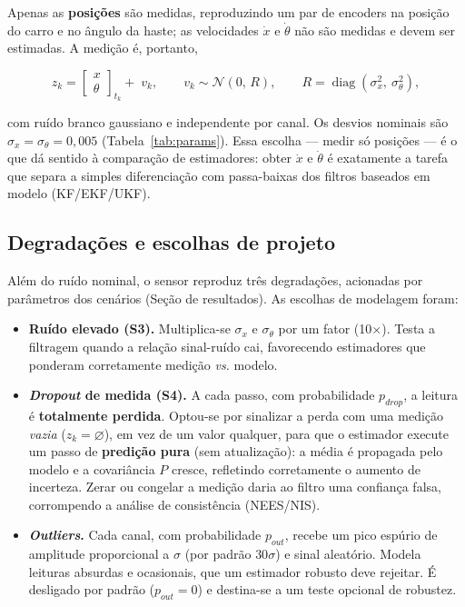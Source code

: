 \documentclass[brazil, 12pt]{article}
\begin{document}
Apenas as \textbf{posições} são medidas, reproduzindo um par de encoders na
posição do carro e no ângulo da haste; as velocidades $\dot{x}$ e $\dot{\theta}$
não são medidas e devem ser estimadas. A medição é, portanto,

\[
z_k =
\begin{bmatrix} x \\ \theta \end{bmatrix}_{t_k}
+\; v_k,
\qquad
v_k \sim \mathcal{N}(0,\,R),
\qquad
R = \operatorname{diag}\!\left(\sigma_x^{2},\ \sigma_\theta^{2}\right),
\]

com ruído branco gaussiano e independente por canal. Os desvios nominais são
$\sigma_x = \sigma_\theta = 0{,}005$ (Tabela~\ref{tab:params}). Essa escolha ---
medir só posições --- é o que dá sentido à comparação de estimadores: obter
$\dot{x}$ e $\dot{\theta}$ é exatamente a tarefa que separa a simples
diferenciação com passa-baixas dos filtros baseados em modelo (KF/EKF/UKF).

\subsection{Degradações e escolhas de projeto}

Além do ruído nominal, o sensor reproduz três degradações, acionadas por
parâmetros dos cenários (Seção de resultados). As escolhas de modelagem foram:

\begin{itemize}
  \item \textbf{Ruído elevado (S3).} Multiplica-se $\sigma_x$ e $\sigma_\theta$
  por um fator (10$\times$). Testa a filtragem quando a relação sinal-ruído
  cai, favorecendo estimadores que ponderam corretamente medição \emph{vs.}
  modelo.

  \item \textbf{\emph{Dropout} de medida (S4).} A cada passo, com probabilidade
  $p_{drop}$, a leitura é \textbf{totalmente perdida}. Optou-se por sinalizar a
  perda com uma medição \emph{vazia} ($z_k=\varnothing$), em vez de um valor
  qualquer, para que o estimador execute um passo de \textbf{predição pura} (sem
  atualização): a média é propagada pelo modelo e a covariância $P$ cresce,
  refletindo corretamente o aumento de incerteza. Zerar ou congelar a medição
  daria ao filtro uma confiança falsa, corrompendo a análise de consistência
  (NEES/NIS).

  \item \textbf{\emph{Outliers}.} Cada canal, com probabilidade $p_{out}$,
  recebe um pico espúrio de amplitude proporcional a $\sigma$ (por padrão
  $30\sigma$) e sinal aleatório. Modela leituras absurdas e ocasionais, que um
  estimador robusto deve rejeitar. É desligado por padrão
  ($p_{out}=0$) e destina-se a um teste opcional de robustez.
\end{itemize}
\end{document}
